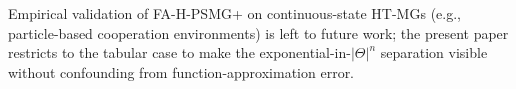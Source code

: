 \documentclass{article}
\def\textsuperscript#1{#1}%
\begin{document}
Empirical validation of FA-H-PSMG\textsuperscript{+} on continuous-state HT-MGs (e.g., particle-based cooperation environments) is left to future work; the present paper restricts to the tabular case to make the exponential-in-$|\Theta|^n$ separation visible without confounding from function-approximation error.
\end{document}
